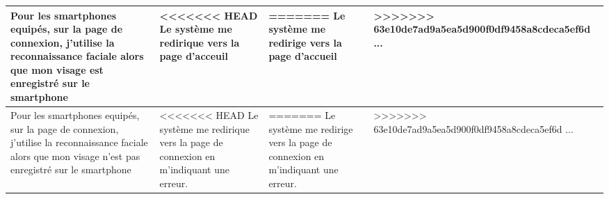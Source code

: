 \documentclass{article}
\begin{document}
\begin{center}
\begin{tabular}{|p{5cm}|p{5cm}|p{5cm}|}
      \hline
      \hline
      Pour les smartphones equipés, sur la page de connexion, j'utilise la reconnaissance faciale alors que mon visage est enregistré sur le smartphone&
<<<<<<< HEAD
      Le système me redirique vers la page d'acceuil&
=======
      Le système me redirige vers la page d'accueil&
>>>>>>> 63e10de7ad9a5ea5d900f0df9458a8cdeca5ef6d
      ... \\

      \hline
      \hline
      Pour les smartphones equipés, sur la page de connexion, j'utilise la reconnaissance faciale alors que mon visage n'est pas enregistré sur le smartphone&
<<<<<<< HEAD
      Le système me redirique vers la page de connexion en m'indiquant une erreur.&
=======
      Le système me redirige vers la page de connexion en m'indiquant une erreur.&
>>>>>>> 63e10de7ad9a5ea5d900f0df9458a8cdeca5ef6d
      ... \\


      \hline

    \end{tabular}
  \end{center}
\end{document}
